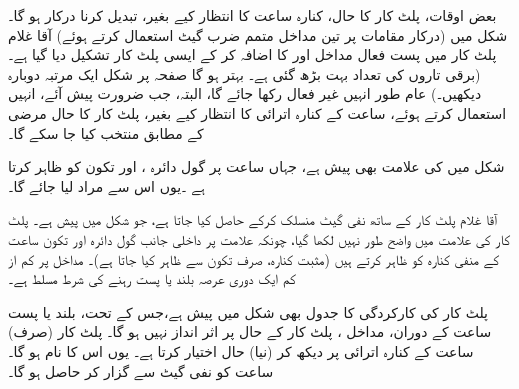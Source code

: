 بعض    اوقات، پلٹ کار کا حال، کنارہ ساعت کا انتظار کیے بغیر، تبدیل کرنا درکار   ہو گا۔شکل   میں    (درکار مقامات پر تین مداخل متمم ضرب گیٹ  استعمال کرتے ہوئے)    آقا غلام پلٹ کار  میں    پست فعال مداخل  اور  کا اضافہ کر کے ایسی پلٹ کار تشکیل دیا گیا  ہے۔ (برقی تاروں کی تعداد   بہت  بڑھ گئی ہے۔ بہتر ہو گا صفحہ  پر شکل  ایک مرتبہ  دوبارہ دیکھیں۔)  عام طور انہیں غیر فعال رکھا جائے گا، البتہ، جب ضرورت پیش آئے، انہیں استعمال کرتے ہوئے، ساعت کے کنارہ اترائی کا انتظار کیے بغیر،  پلٹ کار کا  حال مرضی کے مطابق  منتخب  کیا جا سکے گا۔

شکل میں   کی علامت بھی پیش ہے، جہاں ساعت  پر گول دائرہ  ،    اور  تکون      کو ظاہر کرتا ہے  ۔یوں  اس سے مراد    لیا جائے گا۔


آقا غلام پلٹ کار کے ساتھ نفی گیٹ منسلک کرکے  حاصل  کیا جاتا ہے، جو  شکل    میں پیش ہے۔ پلٹ کار کی علامت میں  واضح طور نہیں لکھا گیا، چونکہ علامت پر  داخلی جانب  گول دائرہ اور تکون  ساعت کے منفی کنارہ کو ظاہر کرتے ہیں (مثبت  کنارہ،  صرف تکون سے ظاہر کیا جاتا ہے)۔ مداخل  پر  کم از  کم ایک دوری عرصہ    بلند یا پست رہنے کی شرط  مسلط ہے۔

 پلٹ کار کی کارکردگی کا جدول بھی    شکل   میں پیش ہے،جس کے تحت، بلند یا پست ساعت کے دوران، مداخل ،   پلٹ کار کے حال پر  اثر انداز  نہیں ہو گا۔ پلٹ کار  (صرف)  ساعت کے کنارہ اترائی پر   دیکھ کر (نیا) حال اختیار کرتا  ہے۔  یوں اس کا نام  ہو گا۔ ساعت کو نفی گیٹ سے گزار کر   حاصل ہو گا۔

